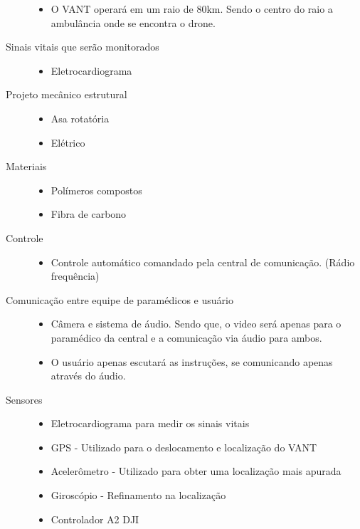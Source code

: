 \begin{description}
\begin{itemize}
  		\item O VANT operará em um raio de 80km. Sendo o centro do raio a ambulância onde se encontra o drone.
  	\end{itemize}
  \item[Sinais vitais que serão monitorados] \hfill 
  	\begin{itemize}
  		\item Eletrocardiograma
  	\end{itemize}
  \item[Projeto mecânico estrutural] \hfill 
  	\begin{itemize}
  		\item Asa rotatória
		\item Elétrico
  	\end{itemize}
  \item[Materiais] \hfill 
  	\begin{itemize}
  		\item Polímeros compostos
		\item Fibra de carbono
  	\end{itemize}
  \item[Controle] \hfill 
  	\begin{itemize}
  		\item Controle automático comandado pela central de comunicação. (Rádio frequência)
  	\end{itemize}
  \item[Comunicação entre equipe de paramédicos e usuário] \hfill 
  	\begin{itemize}
  		\item Câmera e sistema de áudio. Sendo que, o video será apenas para o paramédico da central e a comunicação via áudio para ambos.
  		\item O usuário apenas escutará as instruções, se comunicando apenas através do áudio.
  	\end{itemize}
  \item[Sensores] \hfill 
  	\begin{itemize}
  		\item Eletrocardiograma para medir os sinais vitais
		\item GPS - Utilizado para o deslocamento e localização do VANT
		\item Acelerômetro - Utilizado para obter uma localização mais apurada
		\item Giroscópio - Refinamento na localização
		\item Controlador A2 DJI
  	\end{itemize}

\end{description}

